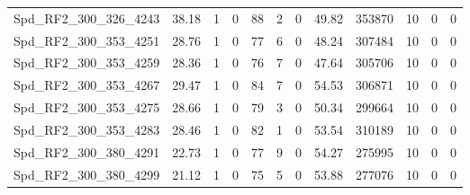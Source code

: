 \begin{longtable}[c]{@{}lrrrrrrrrrrr@{}}
Spd\_RF2\_300\_326\_4243      & 38.18                  & 1                       & 0                       & 88                     & 2                       & 0                       & 49.82                   & 353870                   & 10                       & 0                        & 0                        \\
Spd\_RF2\_300\_353\_4251      & 28.76                  & 1                       & 0                       & 77                     & 6                       & 0                       & 48.24                   & 307484                   & 10                       & 0                        & 0                        \\
Spd\_RF2\_300\_353\_4259      & 28.36                  & 1                       & 0                       & 76                     & 7                       & 0                       & 47.64                   & 305706                   & 10                       & 0                        & 0                        \\
Spd\_RF2\_300\_353\_4267      & 29.47                  & 1                       & 0                       & 84                     & 7                       & 0                       & 54.53                   & 306871                   & 10                       & 0                        & 0                        \\
Spd\_RF2\_300\_353\_4275      & 28.66                  & 1                       & 0                       & 79                     & 3                       & 0                       & 50.34                   & 299664                   & 10                       & 0                        & 0                        \\
Spd\_RF2\_300\_353\_4283      & 28.46                  & 1                       & 0                       & 82                     & 1                       & 0                       & 53.54                   & 310189                   & 10                       & 0                        & 0                        \\
Spd\_RF2\_300\_380\_4291      & 22.73                  & 1                       & 0                       & 77                     & 9                       & 0                       & 54.27                   & 275995                   & 10                       & 0                        & 0                        \\
Spd\_RF2\_300\_380\_4299      & 21.12                  & 1                       & 0                       & 75                     & 5                       & 0                       & 53.88                   & 277076                   & 10                       & 0                        & 0                        \\

\end{longtable}
